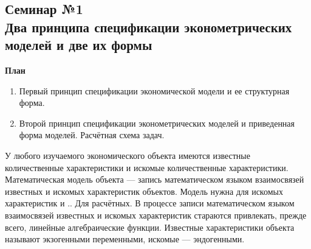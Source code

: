 \documentclass[12pt,a4paper]{article}
\author{Аверьянов Тимофей, Корякин Алексей}
\begin{document}
\begin{center}
\section*{Семинар №1 \\
Два принципа спецификации эконометрических моделей и две их формы}
\end{center}
\begin{center}
\textbf{План}
\end{center}
\begin{enumerate}
\item Первый принцип спецификации экономической модели и ее структурная форма.
\item Второй принцип спецификации эконометрических моделей и приведенная форма моделей. Расчётная схема задач.
\end{enumerate}
\begin{center}
\end{center}

У любого изучаемого экономического объекта имеются известные количественные характеристики и искомые количественные характеристики. Математическая модель объекта — запись математическом языком взаимосвязей известных и искомых характеристик объектов. Модель нужна для искомых характеристик и .. Для расчётных.
В процессе записи математическом языком взаимосвязей известных и искомых характеристик стараются привлекать, прежде всего, линейные алгебраические функции. Известные характеристики объекта называют экзогенными переменными, искомые — эндогенными.
\end{document}

